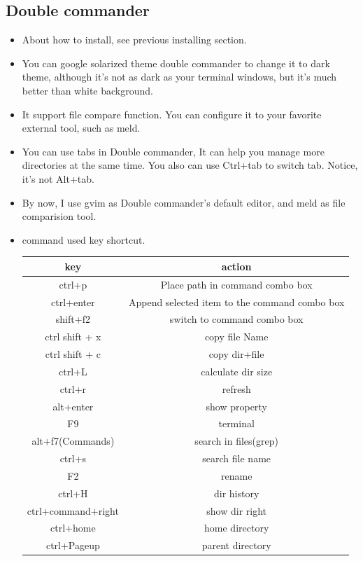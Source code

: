 \documentclass[a4paper,12pt,twoside]{book}
\begin{document}
\subsection{Double commander}
\begin{itemize}
		\item About how to install, see previous installing section.

		\item You can google solarized theme double commander to change it to dark theme, although it's not as dark as your terminal windows, but it's much better than white background. 

		\item It support file compare function. You can configure it to your favorite external tool, such as meld. 

		\item You can use tabs in Double commander, It can help you manage more directories at the same time. You also can use Ctrl+tab to switch tab. Notice, it's not Alt+tab. 

		\item By now, I use gvim as Double commander's default editor, and meld as file comparision tool. 

		\item command used key shortcut.\\

\begin{tabular}{|c|c|}
\hline 
\textbf{key} & \textbf{action} \\ 
\hline 
ctrl+p & Place path in command combo box   \\ 
\hline 
ctrl+enter  & Append selected item to the command combo box \\ 
\hline 
shift+f2  & switch to command combo box \\ 

\hline 
ctrl shift + x & copy file Name \\ 
\hline 
ctrl shift + c & copy dir+file \\ 

\hline \hline  
ctrl+L & calculate dir size  \\ 
\hline 
ctrl+r & refresh  \\ 
\hline 
alt+enter & show property \\ 

\hline 
F9 & terminal  \\ 

\hline 
 alt+f7(Commands) & search in files(grep) \\ 
\hline 
ctrl+s  & search file name \\ 
\hline 
F2  & rename \\ 
\hline
ctrl+H  & dir history \\ 

\hline 
ctrl+command+right  & show dir right  \\ 
\hline 
ctrl+home  & home directory \\ 
\hline 
ctrl+Pageup  & parent directory  \\ 
\hline 
 
\end{tabular} 
\end{itemize}
\end{document}
